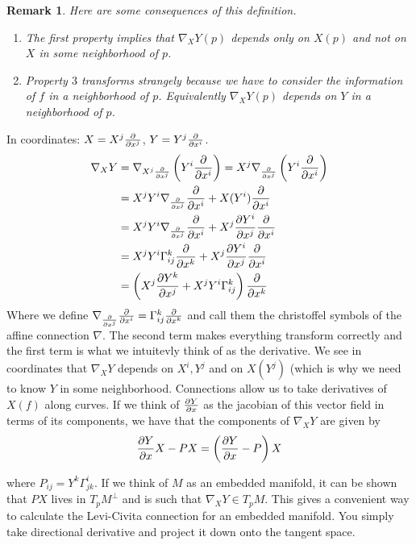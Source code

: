 \documentclass[a4paper]{article}
\newtheorem*{rem}{Remark}
\begin{document}
\begin{rem} Here are some consequences of this definition.
  \begin{enumerate}
    \item The first property implies that $\nabla_X Y(p)$ depends only on $X(p)$ and not on $X$ in some neighborhood of $p$.
    \item Property $3$ transforms strangely because we have to consider the information of $f$ in a neighborhood of $p$. Equivalently $\nabla_X Y(p)$ depends on $Y$ in a neighborhood of $p$.
  \end{enumerate} 
\end{rem}

In coordinates: $X = X^j \pdv{x^j}$, $Y= Y^j \pdv{x^i}$.
\[
  \begin{aligned}
    \nabla_X Y &= \nabla_{X^j \pdv{x^j}} \left(Y^i \pdv{x^i} \right) = X^j \nabla_{\pdv{x^j}} \left(Y^i \pdv{x^i}  \right) \\
               &= X^j Y^i \nabla_{\pdv{x^j}} \pdv{x^i} + X(Y^i) \pdv{x^i} \\
               &= X^j Y^i \nabla_{\pdv{x^j}} \pdv{x^i} + X^j \pdv{Y^i}{x^j} \pdv{x^i} \\
               &= X^jY^i\Gamma^{k}_{ij} \pdv{x^k} + X^j \pdv{Y^i}{x^j}\pdv{x^i} \\
               &=\left( X^j \pdv{Y^k}{x^j} + X^j Y^i \Gamma_{ij}^k \right) \pdv{x^k}
  \end{aligned}
\]
Where we define $\nabla_{\pdv{x^j}}\pdv{x^i} = \Gamma^{k}_{ij} \pdv{x^k}$  and call them the christoffel symbols of the affine connection $\nabla$. The second term makes everything transform correctly and the first term is what we intuitevly think of as the derivative. We see in coordinates that $\nabla_X Y$ depends on $X^i, Y^j$ and on $X(Y^j)$ (which is why we need to know $Y$ in some neighborhood. Connections allow us to take derivatives of $X(f)$ along curves. If we think of $ \pdv{Y}{x}$ as the jacobian of this vector field in terms of its components, we have that the components of $\nabla_X Y$ are given by
\[
  \pdv{Y}{x} X - PX = \left(\pdv{Y}{x} - P \right) X
\]

where $P_{ij} = Y^k \Gamma_{jk}^i$. If we think of $M$ as an embedded manifold, it can be shown that $PX$ lives in $T_pM ^\perp$ and is such that $ \nabla_X Y \in T_pM$. This gives a convenient way to calculate the Levi-Civita connection for an embedded manifold. You simply take directional derivative and project it down onto the tangent space.
\end{document}
